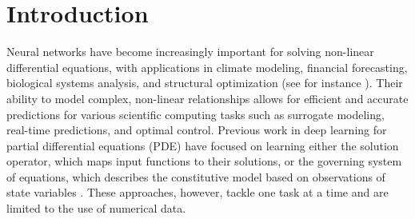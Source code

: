 \documentclass{article}
\begin{document}
\section{Introduction}
\let\thefootnote\relax{}
Neural networks have become increasingly important for solving non-linear differential equations, with applications in climate modeling, financial forecasting, biological systems analysis, and structural optimization (see for instance \cite{poznyak2019survey, sezer2020financial, de2023machine}). Their ability to model complex, non-linear relationships allows for efficient and accurate predictions for various scientific computing tasks such as surrogate modeling, real-time predictions, and optimal control. Previous work in deep learning for partial differential equations (PDE) have focused on learning either the solution operator, which maps input functions to their solutions, or the governing system of equations, which describes the constitutive model based on observations of state variables \cite{chen1995universal, lin2021accelerated, li2020fourier, lu2021learning,zhang2024bayesian, schaeffer2017learning}. These approaches, however, tackle one task at a time and are limited to the use of numerical data.
\end{document}
